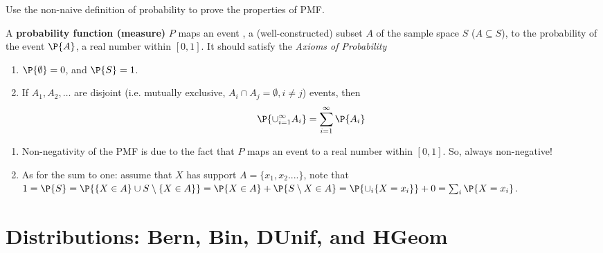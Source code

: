 \begin{exercise} 
	Use the non-naive definition of probability to prove the properties of PMF.
	\begin{hint}
		A \textbf{probability function (measure)} $P$ maps an event , a (well-constructed) subset $A$ of the sample space $S$ ($A\subseteq S$), to the probability of the event $\P{A}$, a real number within $[0,1]$. It should satisfy the \textit{Axioms of Probability} 
\begin{enumerate}
	\item $\P{\emptyset}=0$, and $\P{S}=1$.
	\item If $A_{1},A_{2},\ldots $ are disjoint (i.e. mutually exclusive, $A_i\cap A_j=\emptyset, i\neq j$) events, then
	\begin{equation*}
		\P{\cup_{i=1}^{\infty}A_{i}} = \sum_{i=1}^{\infty}\P{A_{i}}
	\end{equation*}
\end{enumerate}
	\end{hint}
	\begin{solution}
		\begin{enumerate}
			\item Non-negativity of the PMF is due to the fact that $P$ maps an event to a real number within $[0,1]$. So, always non-negative!
			\item As for the sum to one: assume that $X$ has support $A=\{x_1,x_2....\}$, note that $1=\P{S}=\P{\{X\in A\}\cup S\setminus\{X\in A \}}=\P{X\in A} +\P{S\setminus{X\in A }}=\P{\cup_i \{X=x_i\}} +0=\sum_i \P{X=x_i}$. 
		\end{enumerate}
	\end{solution}
\end{exercise}
 
\section{Distributions: Bern, Bin, DUnif, and HGeom}
\label{sec:section-3.3}
 
